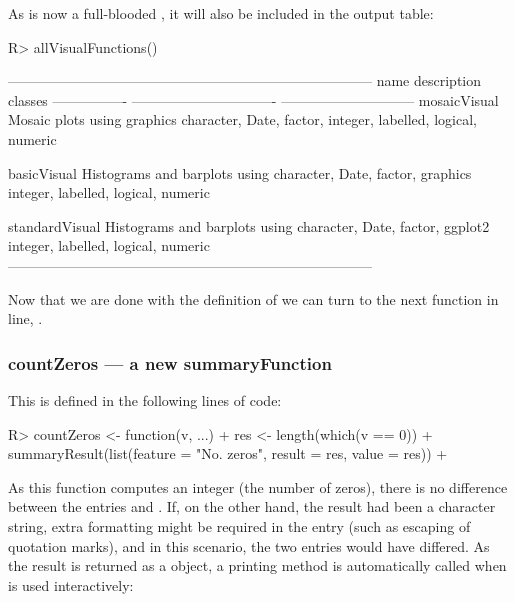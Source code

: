 \documentclass[article,shortnames]{jss}
\begin{document}
As  is now a full-blooded , it
will also be included in the  output table:
\begin{Schunk}
\begin{Sinput}
R> allVisualFunctions()
\end{Sinput}
\begin{Soutput}
------------------------------------------------------------------------------
name             description                     classes                      
---------------- ------------------------------- -----------------------------
mosaicVisual     Mosaic plots using graphics     character, Date, factor,     
                                                 integer, labelled, logical,  
                                                 numeric                      

basicVisual      Histograms and barplots using   character, Date, factor,     
                 graphics                        integer, labelled, logical,  
                                                 numeric                      

standardVisual   Histograms and barplots using   character, Date, factor,     
                 ggplot2                         integer, labelled, logical,  
                                                 numeric                      
------------------------------------------------------------------------------
\end{Soutput}
\end{Schunk}

Now that we are done with the definition of  we can
turn to the next function in line, .

\subsubsection{countZeros --- a new summaryFunction}
This  is defined in the following lines of code:

\begin{Schunk}
\begin{Sinput}
R> countZeros <- function(v, ...) {
+    res <- length(which(v == 0))
+    summaryResult(list(feature = "No. zeros", result = res, value = res))
+  }
\end{Sinput}
\end{Schunk}

As this function computes an integer (the number of zeros),
there is no difference between the entries  and
. If, on the other hand, the result had been a character
string, extra formatting might be required in the  entry
(such as escaping of quotation marks), and in this scenario, the two
entries would have differed. As the result is returned as a
 object, a printing method is automatically called
when  is used interactively:
\end{document}
